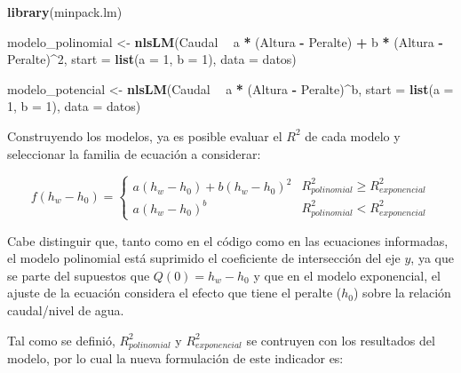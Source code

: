 \documentclass[]{article}
\newenvironment{Shaded}{\begin{snugshade}}{\end{snugshade}}
\newcommand{\KeywordTok}[1]{\textcolor[rgb]{0.13,0.29,0.53}{\textbf{#1}}}
\newcommand{\DataTypeTok}[1]{\textcolor[rgb]{0.13,0.29,0.53}{#1}}
\newcommand{\DecValTok}[1]{\textcolor[rgb]{0.00,0.00,0.81}{#1}}
\newcommand{\StringTok}[1]{\textcolor[rgb]{0.31,0.60,0.02}{#1}}
\newcommand{\OperatorTok}[1]{\textcolor[rgb]{0.81,0.36,0.00}{\textbf{#1}}}
\newcommand{\NormalTok}[1]{#1}
\begin{document}
\begin{Shaded}
\begin{Highlighting}[]
\KeywordTok{library}\NormalTok{(minpack.lm)}

\NormalTok{modelo_polinomial <-}\StringTok{ }\KeywordTok{nlsLM}\NormalTok{(Caudal }\OperatorTok{~}\StringTok{ }\NormalTok{a }\OperatorTok{*}\StringTok{ }\NormalTok{(Altura }\OperatorTok{-}\StringTok{ }\NormalTok{Peralte) }\OperatorTok{+}\StringTok{ }\NormalTok{b }\OperatorTok{*}\StringTok{ }\NormalTok{(Altura }\OperatorTok{-}\StringTok{ }\NormalTok{Peralte)}\OperatorTok{^}\DecValTok{2}\NormalTok{,}
                           \DataTypeTok{start =} \KeywordTok{list}\NormalTok{(}\DataTypeTok{a =} \DecValTok{1}\NormalTok{, }\DataTypeTok{b =} \DecValTok{1}\NormalTok{), }\DataTypeTok{data =}\NormalTok{ datos)}

\NormalTok{modelo_potencial <-}\StringTok{ }\KeywordTok{nlsLM}\NormalTok{(Caudal }\OperatorTok{~}\StringTok{ }\NormalTok{a }\OperatorTok{*}\StringTok{ }\NormalTok{(Altura }\OperatorTok{-}\StringTok{ }\NormalTok{Peralte)}\OperatorTok{^}\NormalTok{b,}
                          \DataTypeTok{start =} \KeywordTok{list}\NormalTok{(}\DataTypeTok{a =} \DecValTok{1}\NormalTok{, }\DataTypeTok{b =} \DecValTok{1}\NormalTok{), }\DataTypeTok{data =}\NormalTok{ datos)}
\end{Highlighting}
\end{Shaded}

Construyendo los modelos, ya es posible evaluar el \(R^2\) de cada
modelo y seleccionar la familia de ecuación a considerar:

\[f(h_w - h_0) = \left\{ {\begin{array}{*{20}{c}}
{a(h_w - h_0) + b{(h_w - h_0)^2}}\\
{a{(h_w - h_0)^b}}
\end{array}} \right.\begin{array}{*{20}{c}}
{R_{polinomial}^2 \ge R_{exponencial}^2}\\
{R_{polinomial}^2 < R_{exponencial}^2}
\end{array}\]

Cabe distinguir que, tanto como en el código como en las ecuaciones
informadas, el modelo polinomial está suprimido el coeficiente de
intersección del eje \(y\), ya que se parte del supuestos que
\(Q(0) = h_w - h_0\) y que en el modelo exponencial, el ajuste de la
ecuación considera el efecto que tiene el peralte (\(h_0\)) sobre la
relación caudal/nivel de agua.

Tal como se definió, \(R_{polinomial}^2\) y \(R_{exponencial}^2\) se
contruyen con los resultados del modelo, por lo cual la nueva
formulación de este indicador es:
\end{document}
